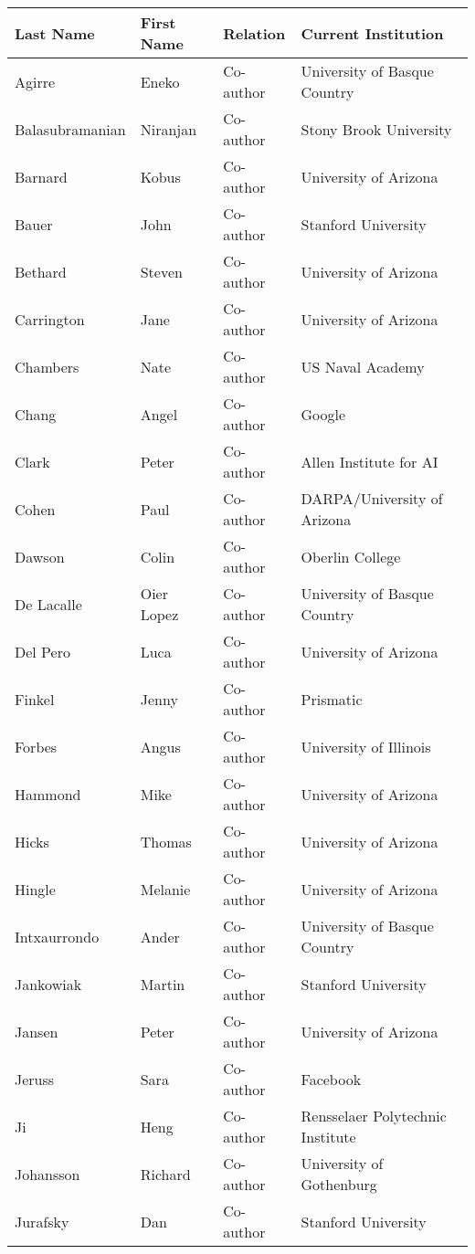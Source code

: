 \documentclass[10pt]{article}
\begin{document}
\begin{description}
\begin{center}
 \begin{tabular}{l|l|l|l}
 {\bf Last Name} & {\bf First Name} & {\bf Relation} & {\bf Current Institution} \\
 \hline
Agirre & Eneko & Co-author & University of Basque Country \\
Balasubramanian & Niranjan & Co-author & Stony Brook University \\
Barnard & Kobus & Co-author & University of Arizona \\
Bauer & John & Co-author & Stanford University \\
Bethard & Steven & Co-author & University of Arizona \\
Carrington & Jane & Co-author & University of Arizona \\
Chambers & Nate & Co-author & US Naval Academy \\
Chang & Angel & Co-author & Google \\
Clark & Peter & Co-author & Allen Institute for AI \\
Cohen & Paul & Co-author & DARPA/University of Arizona \\
Dawson & Colin & Co-author & Oberlin College \\
De Lacalle & Oier Lopez & Co-author & University of Basque Country \\
Del Pero & Luca & Co-author & University of Arizona \\
Finkel & Jenny & Co-author & Prismatic \\
Forbes & Angus & Co-author & University of Illinois \\
Hammond & Mike & Co-author & University of Arizona \\
Hicks & Thomas & Co-author & University of Arizona \\
Hingle & Melanie & Co-author & University of Arizona \\
Intxaurrondo & Ander & Co-author & University of Basque Country \\
Jankowiak & Martin & Co-author & Stanford University \\
Jansen & Peter & Co-author & University of Arizona \\
Jeruss & Sara & Co-author & Facebook \\
Ji & Heng & Co-author & Rensselaer Polytechnic Institute \\
Johansson & Richard & Co-author & University of Gothenburg \\
Jurafsky & Dan & Co-author & Stanford University \\

\end{tabular}
\end{center}
\end{description}
\end{document}
